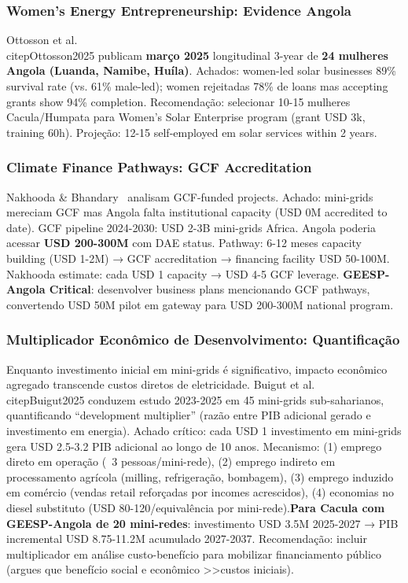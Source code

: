 \documentclass[12pt, a4paper]{article}
\begin{document}
\subsubsection{Women's Energy Entrepreneurship: Evidence Angola}

Ottosson et al.~\\citep{Ottosson2025} publicam
\textbf{março 2025} longitudinal 3-year de
\textbf{24 mulheres Angola (Luanda, Namibe, Huíla)}. Achados: women-led solar businesses 89\% survival rate (vs. 61\% male-led); women rejeitadas 78\% de loans mas accepting grants show 94\% completion. Recomendação: selecionar 10-15 mulheres Cacula/Humpata para Women's Solar Enterprise program (grant USD 3k, training 60h). Projeção: 12-15 self-employed em solar services within 2 years.

\subsubsection{Climate Finance Pathways: GCF Accreditation}

Nakhooda \& Bhandary~\citep{Nakhooda2024} analisam GCF-funded projects. Achado: mini-grids mereciam GCF mas Angola falta institutional capacity (USD 0M accredited to date). GCF pipeline 2024-2030: USD 2-3B mini-grids Africa. Angola poderia acessar
\textbf{USD 200-300M} com DAE status. Pathway: 6-12 meses capacity building (USD 1-2M) → GCF accreditation → financing facility USD 50-100M. Nakhooda estimate: cada USD 1 capacity → USD 4-5 GCF leverage.
\textbf{GEESP-Angola Critical}: desenvolver business plans mencionando GCF pathways, convertendo USD 50M pilot em gateway para USD 200-300M national program.

\subsubsection{Multiplicador Econômico de Desenvolvimento: Quantificação}

Enquanto investimento inicial em mini-grids é significativo, impacto econômico agregado transcende custos diretos de eletricidade. Buigut et al.~\\citep{Buigut2025} conduzem estudo 2023-2025 em 45 mini-grids sub-saharianos, quantificando ``development multiplier'' (razão entre PIB adicional gerado e investimento em energia). Achado crítico: cada USD 1 investimento em mini-grids gera USD 2.5-3.2 PIB adicional ao longo de 10 anos. Mecanismo: (1) emprego direto em operação (~3 pessoas/mini-rede), (2) emprego indireto em processamento agrícola (milling, refrigeração, bombagem), (3) emprego induzido em comércio (vendas retail reforçadas por incomes acrescidos), (4) economias no diesel substituto (USD 80-120/equivalência por mini-rede).\textbf{Para Cacula com GEESP-Angola de 20 mini-redes}: investimento USD 3.5M 2025-2027 → PIB incremental USD 8.75-11.2M acumulado 2027-2037. Recomendação: incluir multiplicador em análise custo-benefício para mobilizar financiamento público (argues que benefício social e econômico >>custos iniciais).
\end{document}
